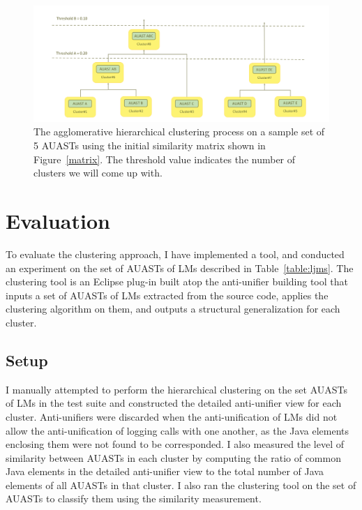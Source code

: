 \begin{figure} [H]
  \centering\includegraphics [width = \textwidth]{Drawing4/overview2.pdf}
  \caption{The agglomerative hierarchical clustering process on a sample set of  5 AUASTs using the initial similarity matrix shown in Figure~\ref{matrix}. The threshold value indicates the number of clusters we will come up with.}
  \label{fig:overview2}
\end{figure}


\section{Evaluation} \label{evaluation}
To evaluate the clustering approach, I have implemented a tool, and conducted an experiment on the set of AUASTs of LMs described in Table~\ref{table:ljms}. The clustering tool is an Eclipse plug-in built atop the anti-unifier building tool that inputs a set of AUASTs of LMs extracted from the source code, applies the clustering algorithm on them, and outputs a structural generalization for each cluster.


\subsection{Setup}  \label{study3-setup}
I manually attempted to perform the hierarchical clustering on the set AUASTs of LMs in the test suite and constructed the detailed anti-unifier view for each cluster. Anti-unifiers were discarded when the anti-unification of LMs did not allow the anti-unification of logging calls with one another, as the Java elements enclosing them were not found to be corresponded. I also measured the level of similarity between AUASTs in each cluster by computing the ratio of common Java elements in the detailed anti-unifier view to the total number of Java elements of all AUASTs in that cluster. I also ran the clustering tool on the set of AUASTs to classify them using the similarity measurement.

